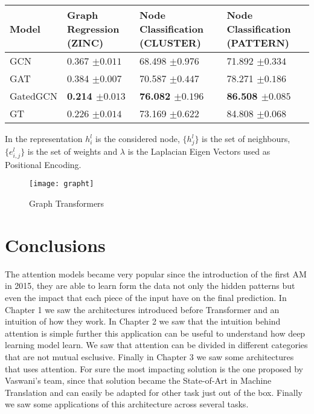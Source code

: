 \documentclass[11pt]{article}
\begin{document}
\newpage
\begin{longtable}{ p{3cm}  p{3cm}   p{3.5cm}  p{3.5cm}}
\hline \hline 
Model			& Graph Regression (ZINC) 		& Node Classification (CLUSTER)			 & Node Classification (PATTERN) \\
\hline \hline 
GCN	 		& 0.367 $\pm 0.011$			& 68.498 $\pm 0.976$		& 71.892 $\pm 0.334$		\\
GAT 			& 0.384 $\pm 0.007$			& 70.587 $\pm 0.447$		& 78.271 $\pm 0.186$	 	\\
GatedGCN 	& \textbf{0.214 $\pm 0.013$} 	& \textbf{76.082 $\pm 0.196$}	& \textbf{86.508 $\pm 0.085$}	\\
GT			& 0.226 $\pm 0.014$ 		& 73.169 $\pm 0.622$		& 84.808 $\pm 0.068$			\\
\hline
\end{longtable}

\noindent In the representation $h^l_i$ is the considered node, $\{h^l_j\}$ is the set of neighbours, $\{e^l_{i,j}\}$ is the set of weights and $\lambda$ is the Laplacian Eigen Vectors used as Positional Encoding.

\begin{figure}[h]
\centerline{\texttt{[image: grapht]}}
\caption{Graph Transformers} 
\label{fig}
\end{figure}



\newpage
\section{Conclusions} %

The attention models became very popular since the introduction of the first AM in 2015, they are able to learn form the data not only the hidden patterns but even the impact that each piece of the input have on the final prediction. In Chapter 1 we saw the architectures introduced before Transformer and an intuition of how they work. In Chapter 2 we saw that the intuition behind attention is simple further this application can be useful to understand how deep learning model learn. We saw that attention can be divided in different categories that are not mutual esclusive. Finally in Chapter 3 we saw some architectures that uses attention. For sure the most impacting solution is the one proposed by Vaswani's team, since that solution became the State-of-Art in Machine  Translation and can easily be adapted for other task just out of the box. Finally we saw some applications of this architecture across several tasks.
\end{document}
